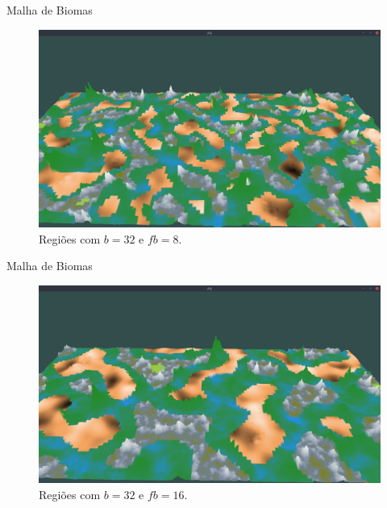 \begin{frame}{Malha de Biomas}
    \begin{figure}[H]
        \centering
        \includegraphics[width=.9\textwidth]{img/re2bfb/fb/8b32.png}
        \caption{Regiões com $b = 32$ e $fb = 8$.}
        \label{fig:img_re2bfb_fb_8b32}
    \end{figure}
    
    
\end{frame}

\begin{frame}{Malha de Biomas}
    \begin{figure}[H]
        \centering
        \includegraphics[width=.9\textwidth]{img/re2bfb/fb/16b32.png}
        \caption{Regiões com $b = 32$ e $fb = 16$.}
        \label{fig:img_re2bfb_fb_16b32}
    \end{figure}
    
    
\end{frame}

